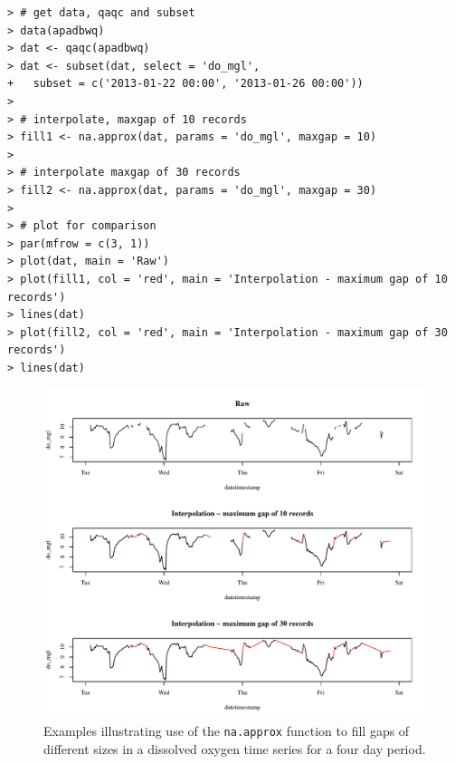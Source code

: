 \documentclass[10pt,letterpaper]{article}\usepackage[]{graphicx}\usepackage[]{color}
\makeatletter
\def\maxwidth{ %
  \ifdim\Gin@nat@width>\linewidth
    \linewidth
  \else
    \Gin@nat@width
  \fi
}
\newenvironment{kframe}{%
 \def\at@end@of@kframe{}%
 \ifinner\ifhmode%
  \def\at@end@of@kframe{\end{minipage}}%
  \begin{minipage}{\columnwidth}%
 \fi\fi%
 \def\FrameCommand##1{\hskip\@totalleftmargin \hskip-\fboxsep
 \colorbox{shadecolor}{##1}\hskip-\fboxsep
     \hskip-\linewidth \hskip-\@totalleftmargin \hskip\columnwidth}%
 \MakeFramed {\advance\hsize-\width
   \@totalleftmargin\z@ \linewidth\hsize
   \@setminipage}}%
 {\par\unskip\endMakeFramed%
 \at@end@of@kframe}
\newenvironment{knitrout}{}{} %
\makeatother
\begin{document}
\begin{knitrout}\small
{}\color{fgcolor}\begin{kframe}
\begin{verbatim}
> # get data, qaqc and subset
> data(apadbwq)
> dat <- qaqc(apadbwq)
> dat <- subset(dat, select = 'do_mgl', 
+   subset = c('2013-01-22 00:00', '2013-01-26 00:00'))
> 
> # interpolate, maxgap of 10 records
> fill1 <- na.approx(dat, params = 'do_mgl', maxgap = 10)
> 
> # interpolate maxgap of 30 records
> fill2 <- na.approx(dat, params = 'do_mgl', maxgap = 30)
> 
> # plot for comparison
> par(mfrow = c(3, 1))
> plot(dat, main = 'Raw')
> plot(fill1, col = 'red', main = 'Interpolation - maximum gap of 10 records')
> lines(dat)
> plot(fill2, col = 'red', main = 'Interpolation - maximum gap of 30 records')
> lines(dat)
\end{verbatim}
\end{kframe}\begin{figure}[!ht]


{\centering \includegraphics[width=\maxwidth]{figure/interp_ex} 

}

\caption[Examples illustrating use of the \texttt{na.approx} function to fill gaps of different sizes in a dissolved oxygen time series for a four day period.]{Examples illustrating use of the \texttt{na.approx} function to fill gaps of different sizes in a dissolved oxygen time series for a four day period.\label{fig:interp_ex}}
\end{figure}


\end{knitrout}
\end{document}
